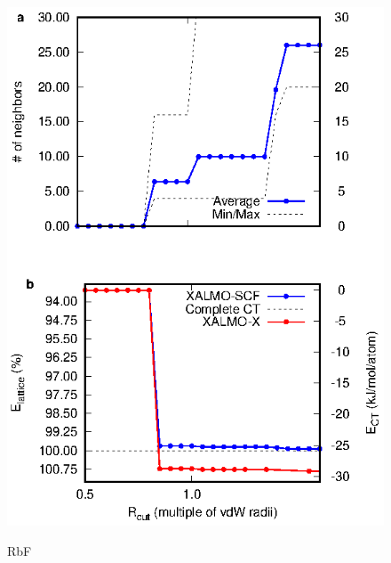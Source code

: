 \documentclass[aps,prb,twocolumn,amsmath,amssymb,superscriptaddress,longbibliography]{revtex4-1}
\begin{document}
\begin{figure}
\includegraphics[scale=1]{./plots/RbF_EvR}
\label{rbf}
\caption{RbF}
\end{figure}
\end{document}
